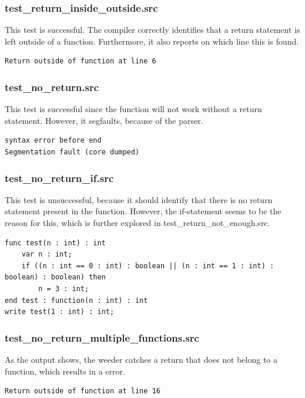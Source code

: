 \documentclass[a4paper,10pt,titlepage]{report}
\begin{document}
\subsubsection{test\_return\_inside\_outside.src}
This test is successful. The compiler correctly identifies that a return statement is left outside of a function. Furthermore, it also reports on which line this is found.
\begin{lstlisting}
Return outside of function at line 6
\end{lstlisting}

\subsubsection{test\_no\_return.src}
This test is successful since the function will not work without a return statement. However, it segfaults, because of the parser.
\begin{lstlisting}
syntax error before end
Segmentation fault (core dumped)
\end{lstlisting}

\subsubsection{test\_no\_return\_if.src}
This test is unsuccessful, because it should identify that there is no return statement present in the function. However, the if-statement seems to be the reason for this, which is further explored in \textsf{test\_return\_not\_enough.src}.
\begin{lstlisting}
func test(n : int) : int
    var n : int;
    if ((n : int == 0 : int) : boolean || (n : int == 1 : int) : boolean) : boolean) then
        n = 3 : int;
end test : function(n : int) : int
write test(1 : int) : int;
\end{lstlisting}

\subsubsection{test\_no\_return\_multiple\_functions.src}
As the output shows, the weeder catches a return that does not belong to a function, which results in a error.
\begin{lstlisting}
Return outside of function at line 16
\end{lstlisting}
\end{document}
